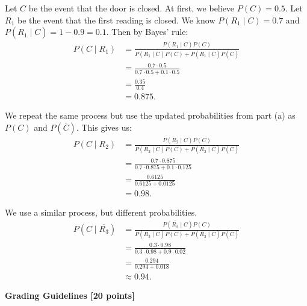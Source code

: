 \documentclass[12pt]{exam}
\begin{document}
\begin{solution}
\begin{qparts}
    \item Let $C$ be the event that the door is closed. At first, we believe $P(C) = 0.5$.
    Let $R_1$ be the event that the first reading is closed. We know $P(R_1 \mid C) = 0.7$
    and $P(R_1 \mid \overline{C}) = 1 - 0.9 = 0.1$. Then by Bayes' rule: 
    \begin{align*}
    P(C \mid R_1) &= \frac{P(R_1 \mid C) P(C)}{P(R_1 \mid C) P(C) + P(R_1 \mid \overline{C}) P(\overline{C})} \\
    &= \frac{0.7 \cdot 0.5}{0.7 \cdot 0.5 + 0.1 \cdot 0.5} \\
    &= \frac{0.35}{0.4} \\
    &= 0.875.
    \end{align*}

    \item We repeat the same process but use the updated probabilities from part (a) as 
    $P(C)$ and $P(\overline{C})$. This gives us:
    \begin{align*}
    P(C \mid R_2) &= \frac{P(R_2 \mid C) P(C)}{P(R_2 \mid C) P(C) + P(R_2 \mid \overline{C}) P(\overline{C})} \\
    &= \frac{0.7 \cdot 0.875}{0.7 \cdot 0.875 + 0.1 \cdot 0.125} \\
    &= \frac{0.6125}{0.6125 + 0.0125} \\
    &= 0.98.
    \end{align*}

    \item We use a similar process, but different probabilities. 
    \begin{align*}
    P(C \mid \overline{R_3}) &= \frac{P(\overline{R_3} \mid C) P(C)}{P(\overline{R_3} \mid C) P(C) + P(\overline{R_3} \mid \overline{C}) P(\overline{C})} \\
    &= \frac{0.3 \cdot 0.98}{0.3 \cdot 0.98 + 0.9 \cdot 0.02} \\
    &= \frac{0.294}{0.294 + 0.018} \\
    &\approx 0.94 .
    \end{align*}
\end{qparts}

\textbf{Grading Guidelines [20 points]}


\end{solution}
\end{document}
